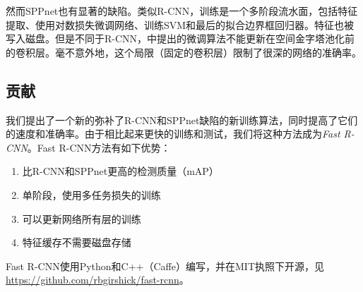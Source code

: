 \documentclass[../main]{subfile}
\begin{document}
然而SPPnet也有显著的缺陷。类似R-CNN，训练是一个多阶段流水面，包括特征提取、使用对数损失微调网络、训练SVM和最后的拟合边界框回归器。特征也被写入磁盘。但是不同于R-CNN，\cite{spp}中提出的微调算法不能更新在空间金字塔池化前的卷积层。毫不意外地，这个局限（固定的卷积层）限制了很深的网络的准确率。

\subsection{贡献}

我们提出了一个新的弥补了R-CNN和SPPnet缺陷的新训练算法，同时提高了它们的速度和准确率。由于相比起来更快的训练和测试，我们将这种方法成为\textit{Fast R-CNN}。Fast R-CNN方法有如下优势：
\begin{enumerate}
    \item 比R-CNN和SPPnet更高的检测质量（mAP）
    \item 单阶段，使用多任务损失的训练
    \item 可以更新网络所有层的训练
    \item 特征缓存不需要磁盘存储
\end{enumerate}

Fast R-CNN使用Python和C++（Caffe）编写，并在MIT执照下开源，见\href{https://github.com/rbgirshick/fast-rcnn}{https://github.com/rbgirshick/fast-rcnn}。
\end{document}
